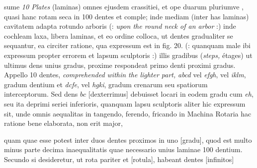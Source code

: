 \begin{minipage}[t]{0.4\textwidth}
sume \textit{10 Plates} (laminas) omnes ejusdem crassitiei, et ope duarum pluriumve , quasi  hanc rotam seca in 100 dentes et comple; inde mediam (inter has laminas) cavitatem adapta rotundo arboris (: \textit{upon the round neck of an arbor} :) inde cochleam laxa, libera laminas, et eo ordine colloca, ut dentes gradualiter se sequantur, ea circiter ratione, qua expressum est in fig. 20. (: quanquam male ibi expressum propter errorem et lapsum sculptoris :) illis gradibus (\textit{steps,} \'{e}tages) ut ultimus dens unius gradus, proxime respondeat primo denti proximi gradus. Appello 10 dentes, \textit{comprehended within the lighter part,} \textit{abcd} vel \textit{efgh}, vel \textit{iklm}, gradum dentium  et \textit{dcfe}, vel \textit{hgki}, gradum crenarum seu spatiorum  interceptorum. Sed dens $bc$ [dexterrimus] debuisset locari in eodem gradu cum \textit{eh}, seu ita deprimi  seriei inferioris, quanquam lapsu sculptoris aliter hic expressum sit, unde omnis aequalitas in tangendo, ferendo, fricando in Machina Rotaria hac ratione bene elaborata, non erit major,
\end{minipage}
\pend
\pstart
\noindent
quam quae esse potest inter duos dentes proximos in uno [gradu], quod est multo minus parte decima inaequalitatis quae necessario  unius laminae 100 dentium. Secundo si desideretur, ut rota pariter et [rotula], habeant dentes [infinitos]
